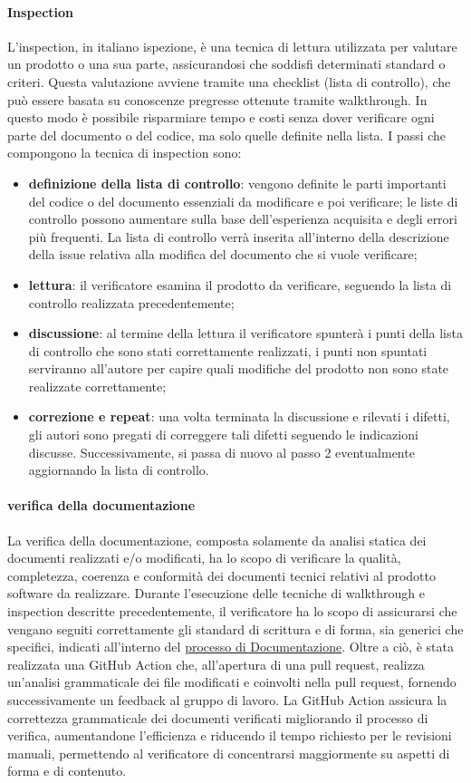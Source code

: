 \paragraph{Inspection}
L'inspection, in italiano ispezione, è una tecnica di lettura utilizzata per valutare un prodotto o una sua parte, assicurandosi che soddisfi determinati standard o criteri.
Questa valutazione avviene tramite una checklist (lista di controllo), che può essere basata su conoscenze pregresse ottenute tramite walkthrough.
In questo modo è possibile risparmiare tempo e costi senza dover verificare ogni parte del documento o del codice, ma solo quelle definite nella lista.
I passi che compongono la tecnica di inspection sono: 
\begin{itemize}
    \item \textbf{definizione della lista di controllo}:  vengono definite le parti importanti del codice o del documento essenziali da modificare e poi verificare; le liste di controllo possono aumentare sulla base dell'esperienza acquisita e degli errori più frequenti. 
    La lista di controllo verrà inserita all'interno della descrizione della issue relativa alla modifica del documento che si vuole verificare;
    \item \textbf{lettura}: il verificatore esamina il prodotto da verificare, seguendo la lista di controllo realizzata precedentemente;
    \item \textbf{discussione}: al termine della lettura il verificatore spunterà i punti della lista di controllo che sono stati correttamente realizzati, i punti non spuntati serviranno all'autore per capire quali modifiche del prodotto non sono state realizzate correttamente;
    \item \textbf{correzione e repeat}:  una volta terminata la discussione e rilevati i difetti, gli autori sono pregati di correggere tali difetti seguendo le indicazioni discusse. Successivamente, si passa di nuovo al passo 2 eventualmente aggiornando la lista di controllo.
\end{itemize}
\paragraph{verifica della documentazione}
La verifica della documentazione, composta solamente da analisi statica dei documenti realizzati e/o modificati, ha lo scopo di verificare
la qualità, completezza, coerenza e conformità dei documenti tecnici relativi al prodotto software da realizzare.
Durante l'esecuzione delle tecniche di walkthrough e inspection descritte precedentemente, il verificatore ha lo scopo di 
assicurarsi che vengano seguiti correttamente gli standard di scrittura e di forma, sia generici che specifici, indicati all'interno
del \hyperref[subsec:documentazione]{processo di Documentazione}.
Oltre a ciò, è stata realizzata una GitHub Action che, all'apertura di una pull request, realizza un'analisi grammaticale dei file 
modificati e coinvolti nella pull request, fornendo successivamente un feedback al gruppo di lavoro.
La GitHub Action assicura la correttezza grammaticale dei documenti verificati migliorando il processo di verifica, aumentandone l'efficienza 
e riducendo il tempo richiesto per le revisioni manuali, permettendo al verificatore di concentrarsi maggiormente su aspetti 
di forma e di contenuto.
